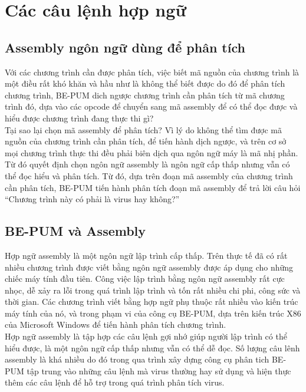
\section{Các câu lệnh hợp ngữ}

  \subsection{Assembly ngôn ngữ dùng để phân tích }

  Với các chương trình cần được phân tích, việc biết mã nguồn của chương trình là một điều rất khó khăn và hầu như là không thể biết được do đó để phân tích chương trình, BE-PUM dich ngược chương trình cần phân tích từ mã chương trình đó, dựa vào các opcode để chuyển sang mã assembly để có thể đọc được và hiểu được chương trình đang thực thi gì?\\

Tại sao lại chọn mã assembly để phân tích? Vì lý do không thể tìm được mã nguồn của chương trình cần phân tích, để tiến hành dịch ngược, và trên cơ sở mọi chương trình thực thi đều phải biên dịch qua ngôn ngữ máy là mã nhị phần. Từ đó quyết định chọn ngôn ngữ assembly là ngôn ngữ cấp thấp nhưng vẫn có thể đọc hiểu và phân tích. Từ đó, dựa trên đoạn mã assembly của chương trình cần phân tích, BE-PUM tiến hành phân tích đoạn mã assembly để trả lời câu hỏi “Chương trình này có phải là virus hay không?”

  \subsection{BE-PUM và Assembly}
  Hợp ngữ assembly là một ngôn ngữ lập trình cấp thấp. Trên thực tế đã có rất nhiều chương trình được viết bằng ngôn ngữ assembly được áp dụng cho những chiếc máy tính đầu tiên. Công việc lập trình bằng ngôn ngữ assembly rất cực nhọc, dễ xảy ra lỗi trong quá trình lập trình và tốn rất nhiều chi phi, công sức và thời gian. Các chương trình viết bằng hợp ngữ phụ thuộc rất nhiều vào kiến trúc máy tính của nó, và trong phạm vi của công cụ BE-PUM, dựa trên kiến trúc X86 của Microsoft Windows để tiến hành phân tích chương trình.\\

Hợp ngữ assembly là tập hợp các câu lệnh gợi nhớ giúp người lập trình có thể hiểu được, là một ngôn ngữ cấp thấp nhưng vẫn có thể dễ đọc. Số lượng câu lênh assembly là khá nhiều do đó trong qua trình xây dựng công cụ phân tich BE-PUM tập trung vào những câu lệnh mà virus thường hay sử dụng và hiện thực thêm các câu lệnh để hỗ trợ trong quá trình phân tích virus.\\

